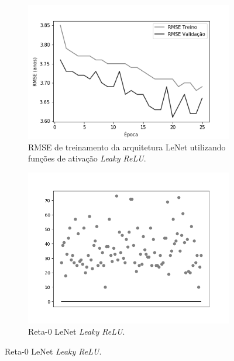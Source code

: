 \begin{figure}[hb!]
\begin{subfigure}[hb]{0.5\linewidth}
		\end{subfigure}\\
		\begin{subfigure}[hb]{0.5\linewidth}
			\caption{RMSE de treinamento da arquitetura LeNet utilizando funções de ativação \emph{Leaky ReLU}.}
			\includegraphics[width=\linewidth]{img/graficos/history/lenet/fig-history-image-treat-2-lenet-lrelu-rmse.png}
		\end{subfigure}
		\begin{subfigure}[hb]{0.5\linewidth}
			\caption{Reta-0 LeNet \emph{Leaky ReLU}.}
		 \includegraphics[width=\linewidth]{img/graficos/reta0/lenet/fig-reta-0-image-treat-2-lenet-lrelu.png}
		\end{subfigure}%
	\end{figure}

